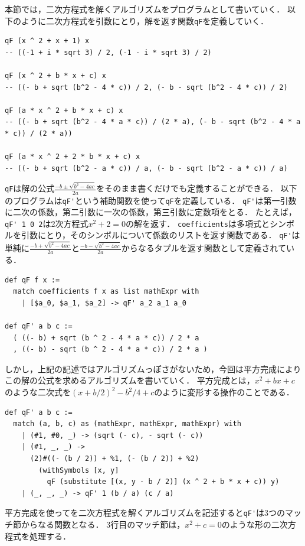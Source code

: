 本節では，二次方程式を解くアルゴリズムをプログラムとして書いていく．
以下のように二次方程式を引数にとり，解を返す関数\lstinline{qF}を定義していく．
\begin{lstlisting}[language=egison,numbers=none]
qF (x ^ 2 + x + 1) x
-- ((-1 + i * sqrt 3) / 2, (-1 - i * sqrt 3) / 2)

qF (x ^ 2 + b * x + c) x
-- ((- b + sqrt (b^2 - 4 * c)) / 2, (- b - sqrt (b^2 - 4 * c)) / 2)

qF (a * x ^ 2 + b * x + c) x
-- ((- b + sqrt (b^2 - 4 * a * c)) / (2 * a), (- b - sqrt (b^2 - 4 * a * c)) / (2 * a))

qF (a * x ^ 2 + 2 * b * x + c) x
-- ((- b + sqrt (b^2 - a * c)) / a, (- b - sqrt (b^2 - a * c)) / a)
\end{lstlisting}
\lstinline{qF}は解の公式$\frac{-b \pm \sqrt{b^2 - 4 a c}}{2 a}$をそのまま書くだけでも定義することができる．
以下のプログラムは\lstinline{qF'}という補助関数を使って\lstinline{qF}を定義している．
\lstinline{qF'}は第一引数に二次の係数，第二引数に一次の係数，第三引数に定数項をとる．
たとえば，\lstinline{qF' 1 0 2}は2次方程式$x^2 + 2 = 0$の解を返す．
\lstinline{coefficients}は多項式とシンボルを引数にとり，そのシンボルについて係数のリストを返す関数である．
\lstinline{qF'}は単純に$\frac{-b + \sqrt{b^2 - 4 a c}}{2 a}$と$\frac{-b - \sqrt{b^2 - 4 a c}}{2 a}$からなるタプルを返す関数として定義されている．
\begin{lstlisting}[language=egison,numbers=none]
def qF f x :=
  match coefficients f x as list mathExpr with
    | [$a_0, $a_1, $a_2] -> qF' a_2 a_1 a_0

def qF' a b c :=
  ( ((- b) + sqrt (b ^ 2 - 4 * a * c)) / 2 * a
  , ((- b) - sqrt (b ^ 2 - 4 * a * c)) / 2 * a )
\end{lstlisting}
しかし，上記の記述ではアルゴリズムっぽさがないため，今回は平方完成によりこの解の公式を求めるアルゴリズムを書いていく．
平方完成とは，$x^2 + b x + c$のような二次式を$(x + b / 2)^2 - b^2 / 4 + c$のように変形する操作のことである．
\begin{lstlisting}[language=egison]
def qF' a b c :=
  match (a, b, c) as (mathExpr, mathExpr, mathExpr) with
    | (#1, #0, _) -> (sqrt (- c), - sqrt (- c))
    | (#1, _, _) ->
      (2)#((- (b / 2)) + %1, (- (b / 2)) + %2)
        (withSymbols [x, y]
          qF (substitute [(x, y - b / 2)] (x ^ 2 + b * x + c)) y)
    | (_, _, _) -> qF' 1 (b / a) (c / a)
\end{lstlisting}
平方完成を使ってを二次方程式を解くアルゴリズムを記述すると\lstinline{qF'}は3つのマッチ節からなる関数となる．
3行目のマッチ節は，$x^2 + c = 0$のような形の二次方程式を処理する．
